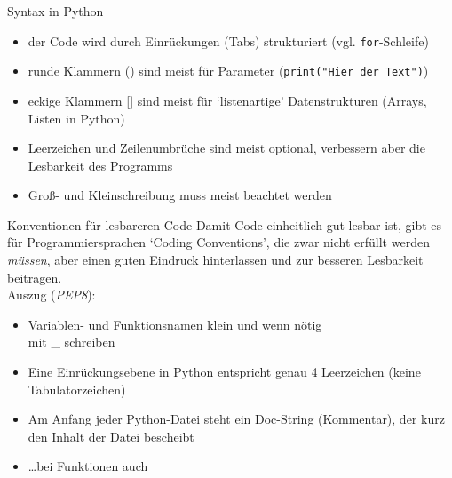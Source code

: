 \begin{frame}{Syntax in Python}
\begin{itemize}
    \item der Code wird durch Einrückungen (Tabs) strukturiert (vgl. \texttt{for}-Schleife)
    \item runde Klammern () sind meist für Parameter (\lstinline{print("Hier der Text")}) 
    \item eckige Klammern [] sind meist für `listenartige' Datenstrukturen (Arrays, Listen in Python)
    \item Leerzeichen und Zeilenumbrüche sind meist optional, verbessern aber die Lesbarkeit des Programms
    \item Groß- und Kleinschreibung muss meist beachtet werden
\end{itemize}
\end{frame}

\begin{frame}{Konventionen für lesbareren Code}
Damit Code einheitlich gut lesbar ist, gibt es für Programmiersprachen 
`Coding Conventions', die zwar nicht erfüllt werden \textit{müssen}, aber 
einen guten Eindruck hinterlassen und zur besseren Lesbarkeit beitragen. \\
Auszug (\textit{PEP8}): 
\begin{itemize}
    \item Variablen- und Funktionsnamen klein und wenn nötig \\ mit \_ schreiben 
    \item Eine Einrückungsebene in Python entspricht genau 4 Leerzeichen (keine Tabulatorzeichen) 
    \item Am Anfang jeder Python-Datei steht ein Doc-String (Kommentar), der kurz den Inhalt der Datei bescheibt
    \item \dots bei Funktionen auch
\end{itemize}
\end{frame}

